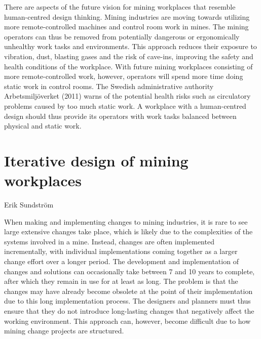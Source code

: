 \documentclass[
  12pt,
]{scrbook}
\newenvironment{chap-auth}
{\vspace{1cm}\begin{center}\begin{flushright}\sffamily\noindent}
  {\end{flushright}\end{center}\vspace{1cm}}
\begin{document}
There are aspects of the future vision for mining workplaces that resemble human-centred design thinking. Mining industries are moving towards utilizing more remote-controlled machines and control room work in mines. The mining operators can thus be removed from potentially dangerous or ergonomically unhealthy work tasks and environments. This approach reduces their exposure to vibration, dust, blasting gases and the risk of cave-ins, improving the safety and health conditions of the workplace. With future mining workplaces consisting of more remote-controlled work, however, operators will spend more time doing static work in control rooms. The Swedish administrative authority Arbetsmiljöverket (2011) warns of the potential health risks such as circulatory problems caused by too much static work. A workplace with a human-centred design should thus provide its operators with work tasks balanced between physical and static work.

\hypertarget{iterative-design-of-mining-workplaces}{%
\chapter{Iterative design of mining workplaces}\label{iterative-design-of-mining-workplaces}}

\begin{chap-auth}
Erik Sundström
\end{chap-auth}

When making and implementing changes to mining industries, it is rare to see large extensive changes take place, which is likely due to the complexities of the systems involved in a mine. Instead, changes are often implemented incrementally, with individual implementations coming together as a larger change effort over a longer period. The development and implementation of changes and solutions can occasionally take between 7 and 10 years to complete, after which they remain in use for at least as long. The problem is that the changes may have already become obsolete at the point of their implementation due to this long implementation process. The designers and planners must thus ensure that they do not introduce long-lasting changes that negatively affect the working environment. This approach can, however, become difficult due to how mining change projects are structured.
\end{document}
